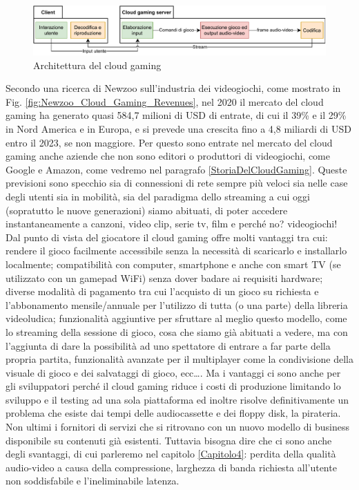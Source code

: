 \begin{figure}[H]
	\includegraphics[width=\linewidth]{immagini/cloud_gaming_general_scheme}
	\caption{Architettura del cloud gaming}
	\label{fig:cloud_gaming_general_scheme}
\end{figure}

Secondo una ricerca di Newzoo sull'industria dei videogiochi, come mostrato in Fig. \ref{fig:Newzoo_Cloud_Gaming_Revenues}, nel 2020 il mercato del cloud gaming ha generato quasi 584,7 milioni di USD di entrate, di cui il 39\% e il 29\% in Nord America e in Europa, e si prevede una crescita fino a 4,8 miliardi di USD entro il 2023, se non maggiore. Per questo sono entrate nel mercato del cloud gaming anche aziende che non sono editori o produttori di videogiochi, come Google e Amazon, come vedremo nel paragrafo \ref{StoriaDelCloudGaming}. Queste previsioni sono specchio sia di connessioni di rete sempre più veloci sia nelle case degli utenti sia in mobilità, sia del paradigma dello streaming a cui oggi (sopratutto le nuove generazioni) siamo abituati, di poter accedere instantaneamente a canzoni, video clip, serie tv, film e perché no? videogiochi! Dal punto di vista del giocatore il cloud gaming offre molti vantaggi tra cui: rendere il gioco facilmente accessibile senza la necessità di scaricarlo e installarlo localmente; compatibilità con computer, smartphone e anche con smart TV (se utilizzato con un gamepad WiFi) senza dover badare ai requisiti hardware; diverse modalità di pagamento tra cui l'acquisto di un gioco su richiesta e l'abbonamento mensile/annuale per l'utilizzo di tutta (o una parte) della libreria videoludica; funzionalità aggiuntive per sfruttare al meglio questo modello, come lo streaming della sessione di gioco, cosa che siamo già abituati a vedere, ma con l'aggiunta di dare la possibilità ad uno spettatore di entrare a far parte della propria partita, funzionalità avanzate per il multiplayer come la condivisione della visuale di gioco e dei salvataggi di gioco, ecc\dots. Ma i vantaggi ci sono anche per gli sviluppatori perché il cloud gaming riduce i costi di produzione limitando lo sviluppo e il testing ad una sola piattaforma ed inoltre risolve definitivamente un problema che esiste dai tempi delle audiocassette e dei floppy disk, la pirateria. Non ultimi i fornitori di servizi che si ritrovano con un nuovo modello di business disponibile su contenuti già esistenti. Tuttavia bisogna dire che ci sono anche degli svantaggi, di cui parleremo nel capitolo \ref{Capitolo4}: perdita della qualità audio-video a causa della compressione, larghezza di banda richiesta all'utente non soddisfabile e l'ineliminabile latenza.


